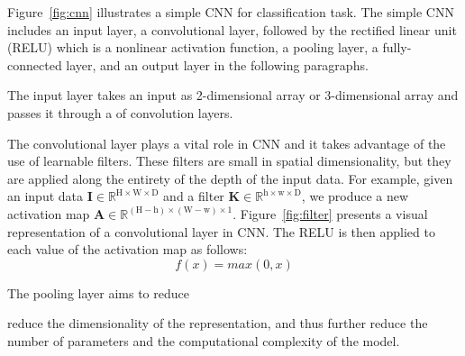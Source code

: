 Figure~\ref{fig:cnn} illustrates a simple CNN for classification task. The simple CNN includes an input layer, a convolutional layer, followed by the rectified linear unit (RELU) which is a nonlinear activation function, a pooling layer, a fully-connected layer, and an output layer in the following paragraphs. 

The input layer takes an input as 2-dimensional array or 3-dimensional array and passes it through a of convolution layers.

The convolutional layer plays a vital role in CNN and it takes advantage of the use of learnable filters. These filters are small in spatial dimensionality, but they are applied along the entirety of the depth of the input data. For example, given an input data $\textbf{I} \in \mathbb{R}^{\text{H} \times \text{W} \times \text{D}}$ and a filter $\textbf{K} \in \mathbb{R}^{\text{h} \times \text{w} \times \text{D}}$, we produce a new activation map $\textbf{A} \in \mathbb{R}^{(\text{H} - \text{h}) \times (\text{W} - \text{w}) \times 1}$. Figure~\ref{fig:filter} presents a visual representation of a convolutional layer in CNN. The RELU is then applied to each value of the activation map as follows:
\begin{equation}
\label{eq:relu}
f(x) = max(0, x)   
\end{equation}

The pooling layer aims to reduce 

reduce the dimensionality of the representation, and thus further reduce the number of parameters and the computational
complexity of the model.







